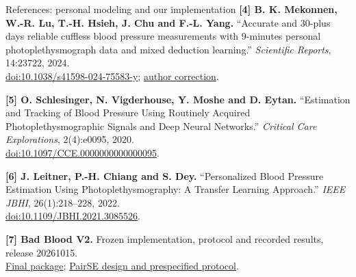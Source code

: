 \documentclass[aspectratio=169,11pt]{beamer}
\begin{document}
\begin{frame}{References: personal modeling and our implementation}
\fontsize{9}{11}\selectfont
\textbf{[4] B. K. Mekonnen, W.-R. Lu, T.-H. Hsieh, J. Chu and F.-L. Yang.} ``Accurate and 30-plus days reliable cuffless blood pressure measurements with 9-minutes personal photoplethysmograph data and mixed deduction learning.'' \emph{Scientific Reports}, 14:23722, 2024.\\
\href{https://doi.org/10.1038/s41598-024-75583-y}{doi:10.1038/s41598-024-75583-y}; \href{https://doi.org/10.1038/s41598-024-79326-x}{author correction}.
\par\medskip
\textbf{[5] O. Schlesinger, N. Vigderhouse, Y. Moshe and D. Eytan.} ``Estimation and Tracking of Blood Pressure Using Routinely Acquired Photoplethysmographic Signals and Deep Neural Networks.'' \emph{Critical Care Explorations}, 2(4):e0095, 2020.\\
\href{https://doi.org/10.1097/CCE.0000000000000095}{doi:10.1097/CCE.0000000000000095}.
\par\medskip
\textbf{[6] J. Leitner, P.-H. Chiang and S. Dey.} ``Personalized Blood Pressure Estimation Using Photoplethysmography: A Transfer Learning Approach.'' \emph{IEEE JBHI}, 26(1):218--228, 2022.\\
\href{https://doi.org/10.1109/JBHI.2021.3085526}{doi:10.1109/JBHI.2021.3085526}.
\par\medskip
\textbf{[7] Bad Blood V2.} Frozen implementation, protocol and recorded results, release 20261015.\\
\href{https://github.com/place-bot/Bad-Blood/tree/research/v2-vitaldb-attention-personalization/model\%20training/v2/final_results_20261015}{Final package}; \href{https://github.com/place-bot/Bad-Blood/blob/research/v2-vitaldb-attention-personalization/model\%20training/v2/paired_se/PROTOCOL.md}{PairSE design and prespecified protocol}.
\end{frame}
\end{document}
